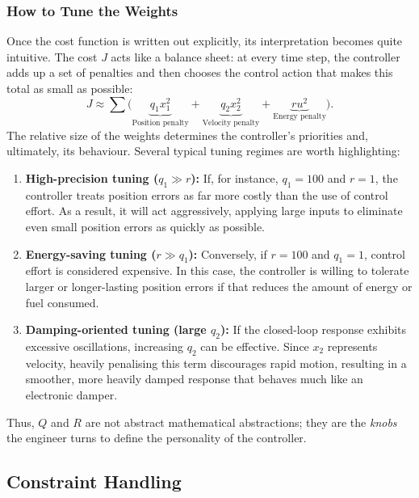 \subsubsection*{How to Tune the Weights}
Once the cost function is written out explicitly, its interpretation becomes quite intuitive. The cost $J$ acts like a balance sheet: at every time step, the controller adds up a set of penalties and then chooses the control action that makes this total as small as possible:
\begin{equation}
	J \approx \sum \big( \underbrace{q_1 x_1^2}_{\text{Position penalty}} 
	+ \underbrace{q_2 x_2^2}_{\text{Velocity penalty}} 
	+ \underbrace{r u^2}_{\text{Energy penalty}} \big) .
\end{equation}
The relative size of the weights determines the controller’s priorities and, ultimately, its behaviour. Several typical tuning regimes are worth highlighting:

\begin{enumerate}
	\item \textbf{High-precision tuning ($q_1 \gg r$):}  
	If, for instance, $q_1 = 100$ and $r = 1$, the controller treats position errors as far more costly than the use of control effort. As a result, it will act aggressively, applying large inputs to eliminate even small position errors as quickly as possible.
	
	\item \textbf{Energy-saving tuning ($r \gg q_1$):}  
	Conversely, if $r = 100$ and $q_1 = 1$, control effort is considered expensive. In this case, the controller is willing to tolerate larger or longer-lasting position errors if that reduces the amount of energy or fuel consumed.
	
	\item \textbf{Damping-oriented tuning (large $q_2$):}  
	If the closed-loop response exhibits excessive oscillations, increasing $q_2$ can be effective. Since $x_2$ represents velocity, heavily penalising this term discourages rapid motion, resulting in a smoother, more heavily damped response that behaves much like an electronic damper.
\end{enumerate}


Thus, $Q$ and $R$ are not abstract mathematical abstractions; they are the \emph{knobs} the engineer turns to define the personality of the controller.

\subsection{Constraint Handling}

